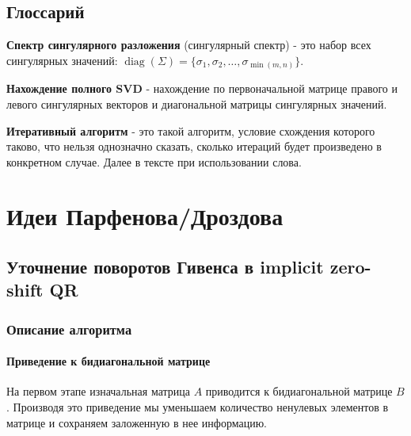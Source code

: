 \documentclass[12pt, a4paper]{report}
\theoremstyle{note}
\begin{document}
\tableofcontents


\newpage
\section{Глоссарий}

\hspace{0.45cm} \textbf{Спектр сингулярного разложения} (сингулярный спектр) - это набор всех сингулярных значений: \( \operatorname{diag}(\Sigma) = \{ \sigma_1, \sigma_2, \dots, \sigma_{\min(m, n)} \} \).

\textbf{Нахождение полного SVD} - нахождение по первоначальной матрице правого и левого сингулярных векторов и диагональной матрицы сингулярных значений. 

\textbf{Итеративный алгоритм} - это такой алгоритм, условие схождения которого таково, что нельзя однозначно сказать, сколько итераций будет произведено в конкретном случае. Далее в тексте при использовании слова. 


\newpage
\chapter{Идеи Парфенова/Дроздова}

\section{Уточнение поворотов Гивенса в implicit zero-shift QR}

\subsection{Описание алгоритма}

\subsubsection{Приведение к бидиагональной матрице}

На первом этапе изначальная матрица $A$ приводится к бидиагональной матрице $B$. Производя это приведение мы уменьшаем количество ненулевых элементов в матрице и сохраняем заложенную в нее информацию.
\end{document}
